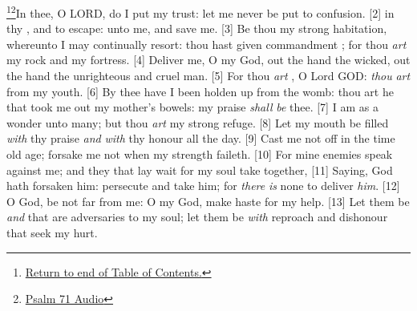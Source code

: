 \footnote{\textcolor[cmyk]{0.99998,1,0,0}{\hyperlink{TOC}{Return to end of Table of Contents.}}}\footnote{\href{https://audiobible.com/bible/psalms_71.html}{\textcolor[cmyk]{0.99998,1,0,0}{Psalm 71 Audio}}}\textcolor[cmyk]{0.99998,1,0,0}{In thee, O LORD, do I put my trust: let me never be put to confusion.}
[2] \textcolor[cmyk]{0.99998,1,0,0}{ in thy , and  to escape:  unto me, and save me.}
[3] \textcolor[cmyk]{0.99998,1,0,0}{Be thou my strong habitation, whereunto I may continually resort: thou hast given commandment ; for thou \emph{art} my rock and my fortress.}
[4] \textcolor[cmyk]{0.99998,1,0,0}{Deliver me, O my God, out  the hand  the wicked, out  the hand   the unrighteous and cruel man.}
[5] \textcolor[cmyk]{0.99998,1,0,0}{For thou \emph{art} , O Lord GOD: \emph{thou} \emph{art}  from my youth.}
[6] \textcolor[cmyk]{0.99998,1,0,0}{By thee have I been holden up from the womb: thou art he that took me out    my mother's bowels: my praise \emph{shall} \emph{be}     thee.}
[7] \textcolor[cmyk]{0.99998,1,0,0}{I am as a wonder unto many; but thou \emph{art} my strong refuge.}
[8] \textcolor[cmyk]{0.99998,1,0,0}{Let my mouth be filled \emph{with} thy praise \emph{and} \emph{with} thy honour all the day.}
[9] \textcolor[cmyk]{0.99998,1,0,0}{Cast me not off in the time    old age; forsake me not when my strength faileth.}
[10] \textcolor[cmyk]{0.99998,1,0,0}{For mine enemies speak against me; and they that lay wait for my soul take  together,}
[11] \textcolor[cmyk]{0.99998,1,0,0}{Saying, God hath forsaken him: persecute and take him; for \emph{there} \emph{is} none to deliver \emph{him}.}
[12] \textcolor[cmyk]{0.99998,1,0,0}{O God, be not far from me: O my God, make haste for my help.}
[13] \textcolor[cmyk]{0.99998,1,0,0}{Let them be  \emph{and}  that are adversaries to my soul; let them be  \emph{with} reproach and dishonour that seek my hurt.}%
